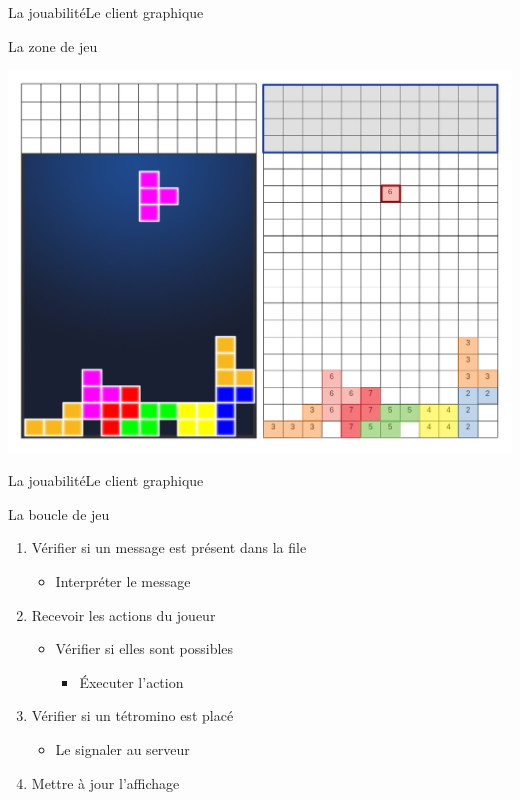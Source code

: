 \documentclass[french]{beamer}
\begin{document}
		\begin{frame}{La jouabilité}{Le client graphique}
			\begin{block}{La zone de jeu}
				\begin{center}
					\includegraphics[scale=0.2]{img/grid.png}
				\end{center}
			\end{block}
		\end{frame}


		\begin{frame}{La jouabilité}{Le client graphique}
			\begin{block}{La boucle de jeu}				
				\begin{enumerate}
					\item Vérifier si un message est présent dans la file
						\begin{itemize}
							\item Interpréter le message
						\end{itemize}
					\item Recevoir les actions du joueur
						\begin{itemize}
							\item Vérifier si elles sont possibles
							\begin{itemize}
								\item \'Executer l'action
							\end{itemize}
						\end{itemize}

					\item Vérifier si un tétromino est placé
						\begin{itemize}
							\item Le signaler au serveur
						\end{itemize}

					\item Mettre à jour l'affichage
				\end{enumerate}
			\end{block}
		\end{frame}
\end{document}
